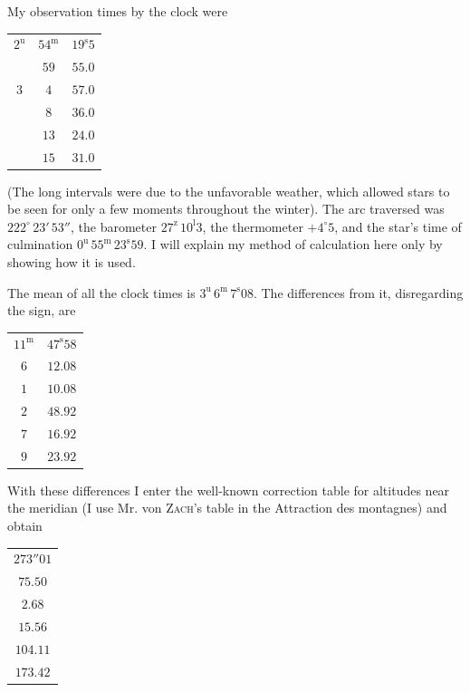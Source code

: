 \par\indent My observation times by the clock were

\begin{center}\fontsize{10}{12}\selectfont\setlength{\tabcolsep}{3pt}\begin{tabular}{ccc}
$2^{\mathrm u}$ & $54^{\mathrm m}$ & $19^{\mathrm s}5$\\
 & $59$ & $55.0$\\
$3$ & $4$ & $57.0$\\
 & $8$ & $36.0$\\
 & $13$ & $24.0$\\
 & $15$ & $31.0$\\
\end{tabular}\end{center}

\par\indent (The long intervals were due to the unfavorable weather, which allowed stars to be seen for only a few moments throughout the winter). The arc traversed was $222^\circ\,23'\,53''$, the barometer $27^{\mathrm z}\,10^{\mathrm l}3$, the thermometer $+4^\circ5$, and the star’s time of culmination $0^{\mathrm u}\,55^{\mathrm m}\,23^{\mathrm s}59$. I will explain my method of calculation here only by showing how it is used.

\par\indent The mean of all the clock times is $3^{\mathrm u}\,6^{\mathrm m}\,7^{\mathrm s}08$. The differences from it, disregarding the sign, are

\begin{center}\fontsize{10}{12}\selectfont\setlength{\tabcolsep}{3pt}\begin{tabular}{cc}
$11^{\mathrm m}$ & $47^{\mathrm s}58$\\
$6$ & $12.08$\\
$1$ & $10.08$\\
$2$ & $48.92$\\
$7$ & $16.92$\\
$9$ & $23.92$\\
\end{tabular}\end{center}

\par\indent With these differences I enter the well-known correction table for altitudes near the meridian (I use Mr. von \textsc{Zach}’s table in the Attraction des montagnes) and obtain

\begin{center}\fontsize{10}{12}\selectfont\setlength{\tabcolsep}{3pt}\begin{tabular}{c}
$273''01$\\
$75.50$\\
$2.68$\\
$15.56$\\
$104.11$\\
$173.42$\\
\end{tabular}\end{center}

